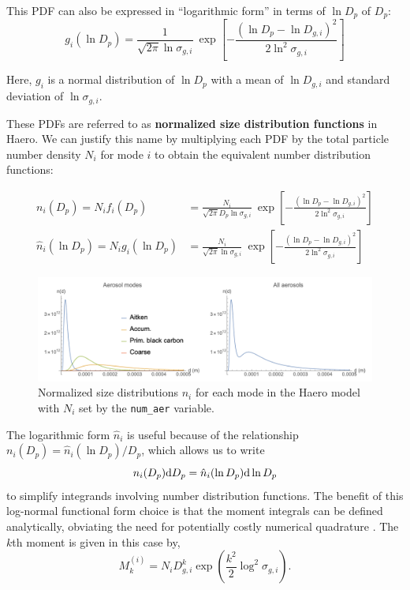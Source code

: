 This PDF can also be expressed in ``logarithmic form'' in terms of $\ln D_p$
of $D_p$:
\begin{equation}\label{eq:log_normal_pdf_log}
  g_i(\ln D_p) = \frac{1}{\sqrt{2\pi} \ln\sigma_{g,i}} \
      \exp \left [ -\frac{(\ln D_p - \ln D_{g,i})^2}{2\ln^2 \sigma_{g,i}} \right]
\end{equation}

Here, $g_i$ is a normal distribution of $\ln D_p$ with a mean of $\ln D_{g,i}$
and standard deviation of $\ln\sigma_{g,i}$.

These PDFs are referred to as {\bf normalized size distribution functions} in
Haero. We can justify this name by multiplying each PDF by the total particle
number density $N_i$ for mode $i$ to obtain the equivalent number distribution
functions:

\begin{align}\label{eq:log_normal_n}
  n_i(D_p) = N_i f_i(D_p) &= \frac{N_i}{\sqrt{2\pi} D_p \ln \sigma_{g,i}} \ 
  \exp \left [ - \frac{(\ln D_p - \ln D_{g,i})^2}{2\ln^2\sigma_{g,i}} \right ] \\
  \hat{n}_{i}(\ln D_p) = N_i g_i(\ln D_p) &= \frac{N_i}{\sqrt{2\pi}\ln \sigma_{g,i}} \ 
	\exp \left [ - \frac{(\ln D_p - \ln D_{g,i})^2}{2\ln^2\sigma_{g,i}} \right ]
\end{align}

\begin{figure}
\centering
\includegraphics[width=\textwidth]{figures/pdf_examples}
\caption{Normalized size distributions $n_i$ for each mode in the Haero model
with $N_i$ set by the \texttt{num\_aer} variable.}\label{fig:mode_dists}
\end{figure}

The logarithmic form $\hat{n}_i$ is useful because of the relationship
$ n_i(D_p) = \hat{n}_i(\ln D_p)/D_p$, which allows us to write
\begin{equation} \labeleq{equ_norm_lognorm}
  n_i(D_p) \d{D_p} = \hat{n}_i(\ln D_p) \d{\ln D_p}
\end{equation}
to simplify integrands involving number distribution functions.
The benefit of this log-normal functional form choice is that the moment integrals can be defined analytically, obviating the need for potentially costly numerical quadrature \cite[eqns.~(3.7)]{Whitby1991}.
The $k$th moment is given in this case by,
\begin{equation}
  M_k^{(i)} = N_i D_{g,i}^k \exp\left(\frac{k^2}{2}\log^2\sigma_{g,i}\right).
\end{equation}

